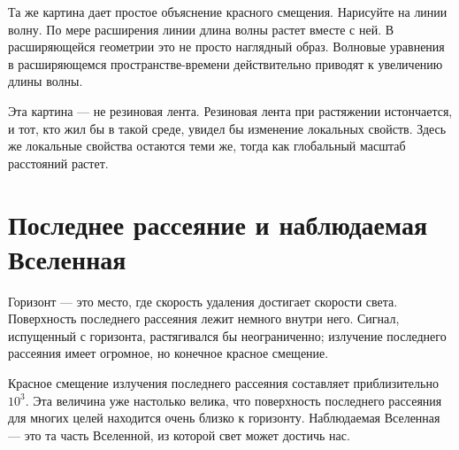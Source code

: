 Та же картина дает простое объяснение красного смещения. Нарисуйте на линии волну. По мере расширения линии длина волны растет вместе с ней. В расширяющейся геометрии это не просто наглядный образ. Волновые уравнения в расширяющемся пространстве-времени действительно приводят к увеличению длины волны.

\begin{classroomqa}
\end{classroomqa}

Эта картина — не резиновая лента. Резиновая лента при растяжении истончается, и тот, кто жил бы в такой среде, увидел бы изменение локальных свойств. Здесь же локальные свойства остаются теми же, тогда как глобальный масштаб расстояний растет.

\section{Последнее рассеяние и наблюдаемая Вселенная}

Горизонт — это место, где скорость удаления достигает скорости света. Поверхность последнего рассеяния лежит немного внутри него. Сигнал, испущенный с горизонта, растягивался бы неограниченно; излучение последнего рассеяния имеет огромное, но конечное красное смещение.

\begin{classroomqa}
\end{classroomqa}

Красное смещение излучения последнего рассеяния составляет приблизительно \(10^3\). Эта величина уже настолько велика, что поверхность последнего рассеяния для многих целей находится очень близко к горизонту. Наблюдаемая Вселенная — это та часть Вселенной, из которой свет может достичь нас.

